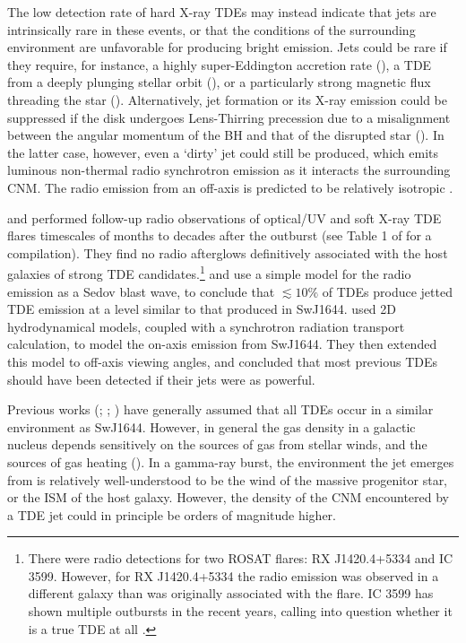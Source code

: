 \documentclass[usenatbib,fleqn]{mnras}
\begin{document}
The low detection rate of hard X-ray TDEs may instead indicate that
jets are intrinsically rare in these events, or that the conditions of the
surrounding environment are unfavorable for producing bright emission.
Jets could be rare if they require, for instance, a highly
super-Eddington accretion rate (\citealt{De-Colle+2012}), a TDE from a
deeply plunging stellar orbit (\citealt{Metzger&Stone2015}), or a
particularly strong magnetic flux threading the star
(\citealt{Tchekhovskoy+2014,Kelley+2014}).  Alternatively, jet formation
or its X-ray emission could be suppressed if the disk undergoes
Lens-Thirring precession due to a misalignment between the angular
momentum of the BH and that of the disrupted star
(\citealt{Stone&Loeb2012}).  In the latter case, however, even a `dirty'
jet could still be produced, which emits luminous non-thermal radio
synchrotron emission as it interacts the surrounding CNM.  The radio
emission from an off-axis is predicted to be relatively isotropic
\citep{Giannios&Metzger2011,Mimica+2015}.

\citet{Bower+2013} and \citet{van-Velzen+2013} performed follow-up
radio observations of optical/UV and soft X-ray TDE flares timescales
of months to decades after the outburst (see Table 1 of
\citealt{Mimica+2015} for a compilation). They find no radio afterglows
definitively associated with the host galaxies of strong TDE
candidates.\footnote{There were radio detections for two ROSAT flares:
  RX J1420.4+5334 and IC 3599. However, for RX J1420.4+5334 the radio
  emission was observed in a different galaxy than was originally
  associated with the flare.  IC 3599 has shown multiple outbursts in
  the recent years, calling into question whether it is a true TDE at all
  \citep{Campana+2015}.}  \citet{Bower+2013} and
\citet{van-Velzen+2013} use a simple model for the radio emission as a
Sedov blast wave, to conclude that $\lesssim 10\%$ of TDEs produce
jetted TDE emission at a level similar to that produced in SwJ1644.  \citet{Mimica+2015} used 2D hydrodynamical models, coupled
with a synchrotron radiation transport calculation, to model the
on-axis emission from SwJ1644. They then extended this
model to off-axis viewing angles, and concluded that most previous
TDEs should have been detected if their jets were as powerful.

Previous works (\citealt{Bower+2013}; \citealt{van-Velzen+2013};
\citealt{Mimica+2015}) have generally assumed that all TDEs occur in a
similar environment as SwJ1644.  However, in general the
gas density in a galactic nucleus depends sensitively on the sources
of gas from stellar winds, and the sources of gas heating
(\citealt{Quataert2004,Generozov+2015}).  In a gamma-ray burst, the
environment the jet emerges from is relatively well-understood to be
the wind of the massive progenitor star, or the ISM of the host
galaxy.  However, the density of the CNM encountered by a TDE jet
could in principle be orders of magnitude higher.
\end{document}
